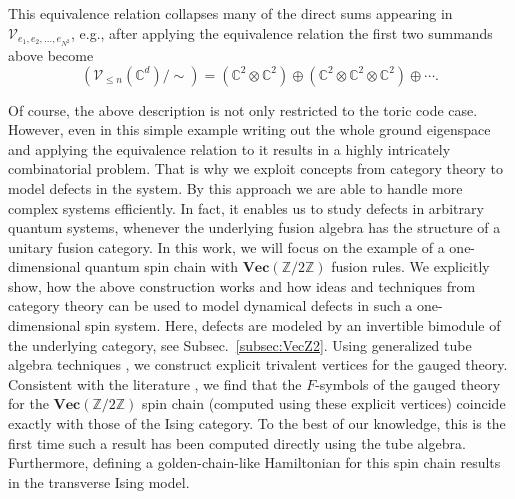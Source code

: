 \documentclass[aps,prb,twocolumn,superscriptaddress,noshowkeys]{revtex4-2}  %
\renewcommand{\Vec}{\textbf{Vec}}
\newcommand{\Z}{\mathbb{Z}}
\theoremstyle{plain}%
\theoremstyle{definition}
\theoremstyle{remark}
\begin{document}
This equivalence relation collapses many of the direct sums appearing in $\mathcal{V}_{e_1,e_2,\ldots,e_{N^2}}$, e.g., after applying the equivalence relation the first two summands above become
\begin{equation}
	\left(\mathcal{V}_{\le n}(\mathbb{C}^d)/\sim\right) = (\mathbb{C}^2\otimes \mathbb{C}^2)\oplus (\mathbb{C}^2\otimes \mathbb{C}^2\otimes \mathbb{C}^2)\oplus \cdots.
\end{equation}

Of course, the above description is not only restricted to the toric code case. However, even in this simple example writing out the whole ground eigenspace and applying the equivalence relation to it results in a highly intricately combinatorial problem. That is why we exploit concepts from category theory to model defects in the system. By this approach we are able to handle more complex systems efficiently. In fact, it enables us to study defects in arbitrary quantum systems, whenever the underlying fusion algebra has the structure of a unitary fusion category. In this work, we will focus on the example of a one-dimensional quantum spin chain with $\Vec(\Z/2\Z)$ fusion rules. We explicitly show, how the above construction works and how ideas and techniques from category theory can be used to model dynamical defects in such a one-dimensional spin system. Here, defects are modeled by an invertible bimodule of the underlying category, see Subsec.~\ref{subsec:VecZ2}. Using generalized tube algebra techniques \cite{ocneanu}, we construct explicit trivalent vertices for the gauged theory. Consistent with the literature \cite{TY,ENO10,Bombin2010,BBCW14,WBV17}, we find that the $F$-symbols of the gauged theory for the $\Vec(\Z/2\Z)$ spin chain (computed using these explicit vertices) coincide exactly with those of the Ising category. To the best of our knowledge, this is the first time such a result has been computed directly using the tube algebra. Furthermore, defining a golden-chain-like Hamiltonian \cite{Feiguin2007} for this spin chain results in the transverse Ising model.
\end{document}

